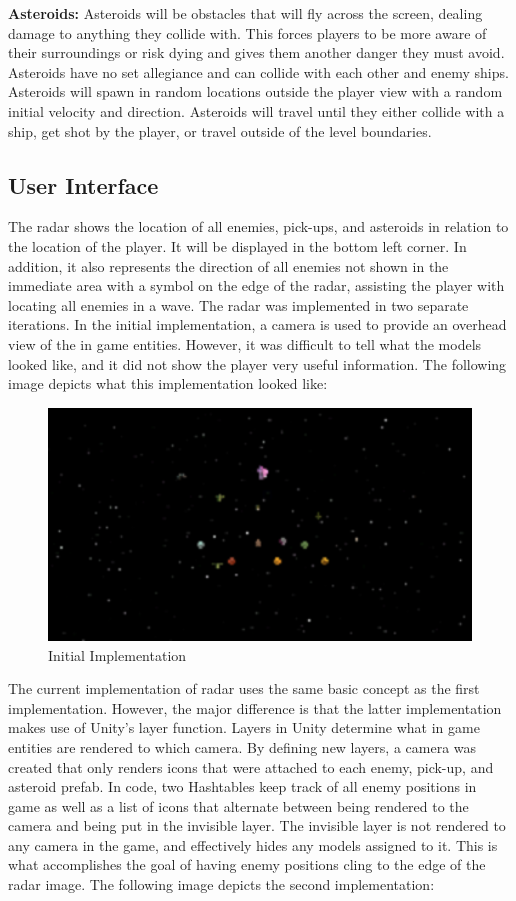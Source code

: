 \documentclass[12pt]{article}       %
\def\hs{\hspace{15pt}}
\begin{document}
	{\bf Asteroids:}  Asteroids will be obstacles that will fly across the screen, dealing damage to anything they collide with. This forces players to be more aware of their surroundings or risk dying and gives them another danger they must avoid. Asteroids have no set allegiance and can collide with each other and enemy ships. Asteroids will spawn in random locations outside the player view with a random initial velocity and direction. Asteroids will travel until they either collide with a ship, get shot by the player, or travel outside of the level boundaries.

\subsection{User Interface} %

	\hs {\bf Radar:} The radar shows the location of all enemies, pick-ups, and asteroids in relation to the location of the player. It will be displayed in the bottom left corner. In addition, it also represents the direction of all enemies not shown in the immediate area with a symbol on the edge of the radar, assisting the player with locating all enemies in a wave. The radar was implemented in two separate iterations. In the initial implementation, a camera is used to provide an overhead view of the in game entities. However, it was difficult to tell what the models looked like, and it did not show the player very useful information. The following image depicts what this implementation looked like:

\begin{figure} [H]
\centering
\includegraphics[width=4.5in]{minimapExample1.png}
\caption{Initial Implementation} \label{RadarOne}
\end{figure}

	The current implementation of radar uses the same basic concept as the first implementation. However, the major difference is that the latter implementation makes use of Unity's layer function. Layers in Unity determine what in game entities are rendered to which camera. By defining new layers, a camera was created that only renders icons that were attached to each enemy, pick-up, and asteroid prefab. In code, two Hashtables keep track of all enemy positions in game as well as a list of icons that alternate between being rendered to the camera and being put in the invisible layer. The invisible layer is not rendered to any camera in the game, and effectively hides any models assigned to it. This is what accomplishes the goal of having enemy positions cling to the edge of the radar image. The following image depicts the second implementation:
\end{document}
